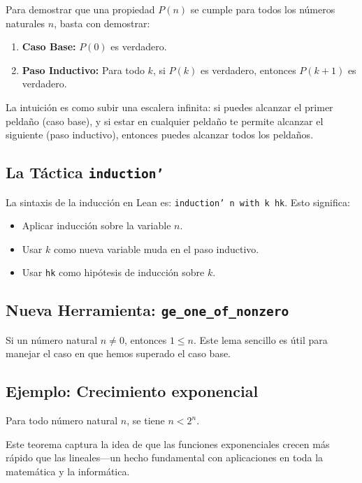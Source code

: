 Para demostrar que una propiedad $P(n)$ se cumple para todos los números
naturales $n$, basta con demostrar:

\begin{enumerate}
  \item \textbf{Caso Base:} $P(0)$ es verdadero.
  \item \textbf{Paso Inductivo:} Para todo $k$, si $P(k)$ es verdadero,
        entonces $P(k+1)$ es verdadero.
\end{enumerate}

La intuición es como subir una escalera infinita: si puedes alcanzar el
primer peldaño (caso base), y si estar en cualquier peldaño te permite
alcanzar el siguiente (paso inductivo), entonces puedes alcanzar todos los
peldaños.

\subsection{La Táctica \texttt{induction'}}

La sintaxis de la inducción en Lean es:
\texttt{induction' n with k hk}. Esto significa:

\begin{itemize}
  \item Aplicar inducción sobre la variable $n$.
  \item Usar $k$ como nueva variable muda en el paso inductivo.
  \item Usar \texttt{hk} como hipótesis de inducción sobre $k$.
\end{itemize}

\subsection{Nueva Herramienta: \texttt{ge\_one\_of\_nonzero}}

Si un número natural $n \neq 0$, entonces $1 \leq n$. Este lema sencillo
es útil para manejar el caso en que hemos superado el caso base.

\subsection{Ejemplo: Crecimiento exponencial}

\begin{theorem}
Para todo número natural $n$, se tiene $n < 2^n$.
\end{theorem}

Este teorema captura la idea de que las funciones exponenciales crecen
más rápido que las lineales—un hecho fundamental con aplicaciones en toda
la matemática y la informática.

